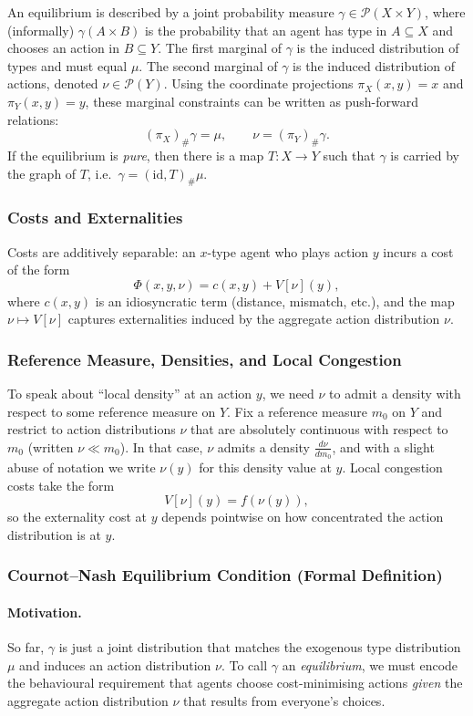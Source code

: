An equilibrium is described by a joint probability measure $\gamma\in\mathcal{P}(X\times Y)$, where (informally)
$\gamma(A\times B)$ is the probability that an agent has type in $A\subseteq X$ and chooses an action in $B\subseteq Y$.
The first marginal of $\gamma$ is the induced distribution of types and must equal $\mu$.
The second marginal of $\gamma$ is the induced distribution of actions, denoted $\nu\in\mathcal{P}(Y)$.
Using the coordinate projections $\pi_X(x,y)=x$ and $\pi_Y(x,y)=y$, these marginal constraints can be written as
push-forward relations:
$$
(\pi_X)_{\#}\gamma=\mu,\qquad \nu=(\pi_Y)_{\#}\gamma.
$$
If the equilibrium is \emph{pure}, then there is a map $T:X\to Y$ such that $\gamma$ is carried by the graph of $T$,
i.e.\ $\gamma=(\mathrm{id},T)_{\#}\mu$.

\subsubsection{Costs and Externalities}
Costs are additively separable: an $x$-type agent who plays action $y$ incurs a cost of the form
$$
\Phi(x,y,\nu)=c(x,y)+V[\nu](y),
$$
where $c(x,y)$ is an idiosyncratic term (distance, mismatch, etc.), and the map $\nu\mapsto V[\nu]$ captures
externalities induced by the aggregate action distribution $\nu$.

\subsubsection{Reference Measure, Densities, and Local Congestion}
To speak about ``local density'' at an action $y$, we need $\nu$ to admit a density with respect to some reference
measure on $Y$.
Fix a reference measure $m_0$ on $Y$ and restrict to action distributions $\nu$ that are absolutely continuous with
respect to $m_0$ (written $\nu\ll m_0$). In that case, $\nu$ admits a density $\frac{d\nu}{dm_0}$, and with a slight abuse
of notation we write $\nu(y)$ for this density value at $y$.
Local congestion costs take the form
$$
V[\nu](y)=f(\nu(y)),
$$
so the externality cost at $y$ depends pointwise on how concentrated the action distribution is at $y$.

\subsubsection{Cournot--Nash Equilibrium Condition (Formal Definition)}\label{sec:cn_equilibrium_definition}
\paragraph{Motivation.}
So far, $\gamma$ is just a joint distribution that matches the exogenous type distribution $\mu$ and induces an action
distribution $\nu$. To call $\gamma$ an \emph{equilibrium}, we must encode the behavioural requirement that agents choose
cost-minimising actions \emph{given} the aggregate action distribution $\nu$ that results from everyone's choices.

